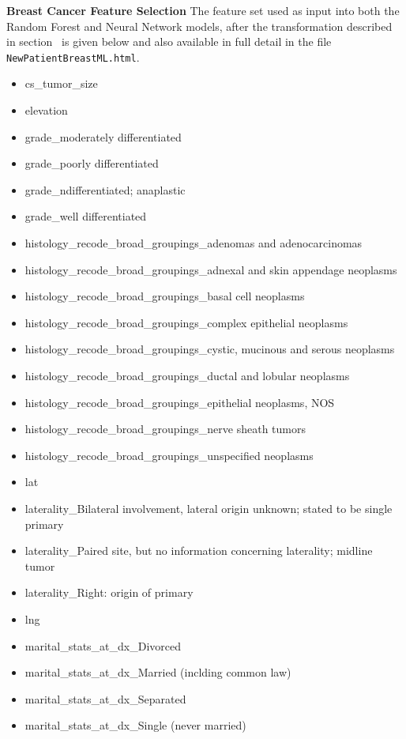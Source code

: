 \documentclass[10pt,letterpaper]{article}
\newcommand{\codewhite}[1]{\colorbox{white}{\texttt{#1}}}
\begin{document}
{\bf Breast Cancer Feature Selection} The feature set used as input into both the Random Forest and Neural Network models, after the transformation described in section~ is given below and also available in full detail in the file 
\codewhite{NewPatientBreastML.html}.

\begin{itemize}[noitemsep]
\item cs\_tumor\_size
\item elevation
\item grade\_moderately differentiated
\item grade\_poorly differentiated
\item grade\_ndifferentiated; anaplastic
\item grade\_well differentiated
\item histology\_recode\_broad\_groupings\_adenomas and adenocarcinomas
\item histology\_recode\_broad\_groupings\_adnexal and skin appendage neoplasms
\item histology\_recode\_broad\_groupings\_basal cell neoplasms
\item histology\_recode\_broad\_groupings\_complex epithelial neoplasms
\item histology\_recode\_broad\_groupings\_cystic, mucinous and serous neoplasms
\item histology\_recode\_broad\_groupings\_ductal and lobular neoplasms
\item histology\_recode\_broad\_groupings\_epithelial neoplasms, NOS
\item histology\_recode\_broad\_groupings\_nerve sheath tumors
\item histology\_recode\_broad\_groupings\_unspecified neoplasms
\item lat
\item laterality\_Bilateral involvement, lateral origin unknown; stated to be single primary
\item laterality\_Paired site, but no information concerning laterality; midline tumor
\item laterality\_Right: origin of primary
\item lng
\item marital\_stats\_at\_dx\_Divorced
\item marital\_stats\_at\_dx\_Married (inclding common law)
\item marital\_stats\_at\_dx\_Separated
\item marital\_stats\_at\_dx\_Single (never married)

\end{itemize}
\end{document}
